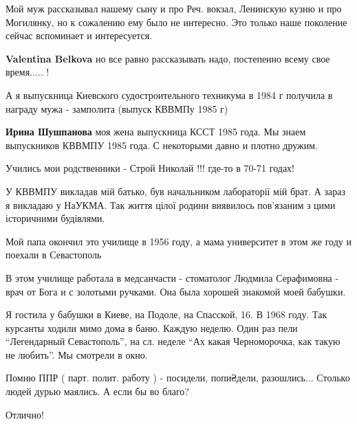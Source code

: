 \begin{itemize}

Мой муж рассказывал нашему сыну и про Реч. вокзал, Ленинскую кузню и про
Могилянку, но к сожалению ему было не интересно. Это только наше поколение
сейчас вспоминает и интересуется.

\textbf{Valentina Belkova} но все равно рассказывать надо, постепенно всему свое время..... !


А я выпускница Киевского судостроительного техникума в 1984 г получила в
награду мужа - замполита (выпуск КВВМПу 1985 г)


\textbf{Ирина Шушпанова} моя жена выпускница КССТ 1985 года. Мы знаем выпускников КВВМПУ 1985 года. С некоторыми давно и плотно дружим.

Учились мои родственники - Строй Николай !!! где-то в 70-71 годах!


У КВВМПУ викладав мій батько, був начальником лабораторії мій брат. А зараз я
викладаю у НаУКМА. Так життя цілої родини виявилось пов'язаним з цими
історичними будівлями.


Мой папа окончил это училище в 1956 году, а мама университет в этом же году и поехали в Севастополь


В этом училище работала в медсанчасти - стоматолог Людмила Серафимовна - врач от
Бога и с золотыми ручками. Она была хорошей знакомой моей бабушки.



Я гостила у бабушки в Киеве, на Подоле, на Спасской, 16. В 1968 году. Так
курсанты ходили мимо дома в баню. Каждую неделю. Один раз пели \enquote{Легендарный
Севастополь}, на сл. неделе \enquote{Ах какая Черноморочка, как такую не любить}. Мы
смотрели в окно.

Помню ППР ( парт. полит. работу ) - посидели, попи₴дели, разошлись...
Столько людей дурью маялись. А если бы во благо?

Отлично!



\end{itemize}
